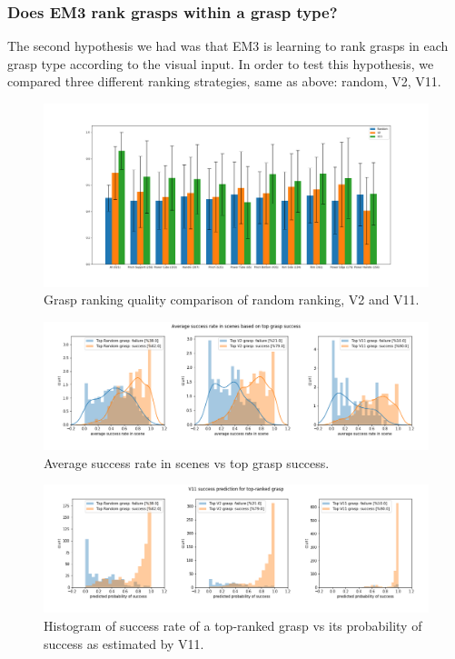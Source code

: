\subsubsection{Does EM3 rank grasps within a grasp type?}
\noindent

The second hypothesis we had was that EM3 is learning to rank grasps in each grasp type according to the visual input. In order to test this hypothesis, we compared three different ranking strategies, same as above: random, V2, V11. 
\begin{figure}
\centering
\includegraphics[width=0.999\columnwidth]{images/post-analysis/Ranking_quality_mean_AUC.png}
\caption{Grasp ranking quality comparison of random ranking, V2 and V11.}
\label{fig:post5}
\end{figure}

\begin{figure}
\centering
\includegraphics[width=0.8\columnwidth]{images/post-analysis/Average_success_rate_in_scenes_based_on_top_grasp_success.png}
\caption{Average success rate in scenes vs top grasp success.}
\label{fig:post7}
\end{figure}

\begin{figure}
\centering
\includegraphics[width=0.8\columnwidth]{images/post-analysis/V11_success_prediction_for_top-ranked_grasp.png}
\caption{Histogram of success rate of a top-ranked grasp vs its probability of success as estimated by V11.}
\label{fig:post8}
\end{figure}

